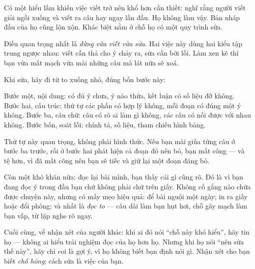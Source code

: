 \documentclass[../../english.tex]{subfiles}
\begin{document}
\begin{dongian}
Có một hiểu lầm khiến việc viết trở nên khổ hơn cần thiết: nghĩ rằng người viết giỏi ngồi xuống và viết ra câu hay ngay lần đầu. Họ không làm vậy. Bản nháp đầu của họ cũng lộn xộn. Khác biệt nằm ở chỗ họ có một quy trình sửa.

Điều quan trọng nhất là \emph{đừng vừa viết vừa sửa}. Hai việc này dùng hai kiểu tập trung ngược nhau: viết cần thả cho ý chảy ra, sửa cần bới lỗi. Làm xen kẽ thì bạn vừa mất mạch vừa mài những câu mà lát nữa sẽ xoá.

Khi sửa, hãy đi từ to xuống nhỏ, đúng bốn bước này:

Bước một, nội dung: có đủ ý chưa, ý nào thừa, kết luận có số liệu đỡ không. Bước hai, cấu trúc: thứ tự các phần có hợp lý không, mỗi đoạn có đúng một ý không. Bước ba, câu chữ: câu có rõ ai làm gì không, các câu có nối được với nhau không. Bước bốn, soát lỗi: chính tả, số liệu, tham chiếu hình bảng.

Thứ tự này quan trọng, không phải hình thức. Nếu bạn mài giũa từng câu ở bước ba trước, rồi ở bước hai phát hiện cả đoạn đó nên bỏ, bạn mất công --- và tệ hơn, vì đã mất công nên bạn sẽ tiếc và giữ lại một đoạn đáng bỏ.

Còn một khó khăn nữa: đọc lại bài mình, bạn thấy cái gì cũng rõ. Đó là vì bạn đang đọc ý trong đầu bạn chứ không phải chữ trên giấy. Không cố gắng nào chữa được chuyện này, nhưng có mấy mẹo hiệu quả: để bài nguội một ngày; in ra giấy hoặc đổi phông; và nhất là \emph{đọc to} --- câu dài làm bạn hụt hơi, chỗ gãy mạch làm bạn vấp, từ lặp nghe rõ ngay.

Cuối cùng, về nhận xét của người khác: khi ai đó nói ``chỗ này khó hiểu'', hãy tin họ --- không ai hiểu trải nghiệm đọc của họ hơn họ. Nhưng khi họ nói ``nên sửa thế này'', hãy chỉ coi là gợi ý, vì họ không biết bạn định nói gì. Nhận xét cho bạn biết \emph{chỗ hỏng}; cách sửa là việc của bạn.
\end{dongian}
\end{document}

